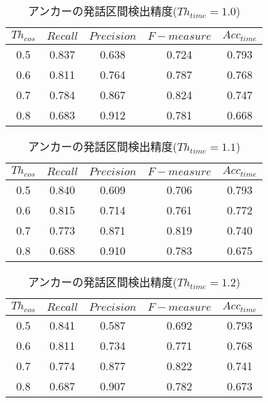 \begin{table}[H]
  \begin{center}
    \caption{アンカーの発話区間検出精度($Th_{time}=1.0$) \label{table:result_get_anchor10}}
    \begin{tabular}{|c||c|c|c|c|} \hline
      $Th_{cos}$ & $Recall$ & $Precision$ & $F-measure$ & $Acc_{time}$\\ \hline
0.5 & 0.837 & 0.638 & 0.724 & 0.793 \\ \hline
0.6 & 0.811 & 0.764 & 0.787 & 0.768 \\ \hline
0.7 & 0.784 & 0.867 & 0.824 & 0.747 \\ \hline
0.8 & 0.683 & 0.912 & 0.781 & 0.668 \\ \hline

    \end{tabular}
  \end{center}
\end{table}

\begin{table}[H]
  \begin{center}
    \caption{アンカーの発話区間検出精度($Th_{time}=1.1$) \label{table:result_get_anchor11}}
    \begin{tabular}{|c||c|c|c|c|} \hline
      $Th_{cos}$ & $Recall$ & $Precision$ & $F-measure$ & $Acc_{time}$\\ \hline
0.5 & 0.840 & 0.609 & 0.706 & 0.793 \\ \hline
0.6 & 0.815 & 0.714 & 0.761 & 0.772 \\ \hline
0.7 & 0.773 & 0.871 & 0.819 & 0.740 \\ \hline
0.8 & 0.688 & 0.910 & 0.783 & 0.675 \\ \hline

    \end{tabular}
  \end{center}
\end{table}


\begin{table}[H]
  \begin{center}
    \caption{アンカーの発話区間検出精度($Th_{time}=1.2$) \label{table:result_get_anchor12}}
    \begin{tabular}{|c||c|c|c|c|} \hline
      $Th_{cos}$ & $Recall$ & $Precision$ & $F-measure$ & $Acc_{time}$\\ \hline
0.5 & 0.841 & 0.587 & 0.692 & 0.793 \\ \hline
0.6 & 0.811 & 0.734 & 0.771 & 0.768 \\ \hline
0.7 & 0.774 & 0.877 & 0.822 & 0.741 \\ \hline
0.8 & 0.687 & 0.907 & 0.782 & 0.673 \\ \hline

    \end{tabular}
  \end{center}
\end{table}

